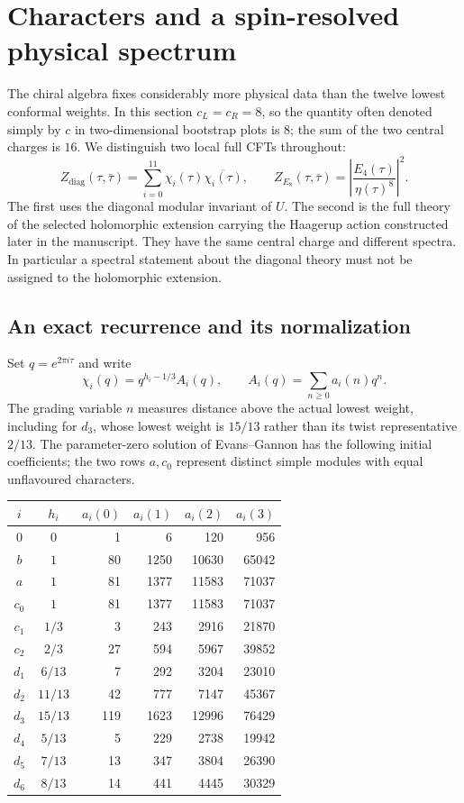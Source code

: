 \section{Characters and a spin-resolved physical spectrum}
\label{sec:physics-spectrum}

The chiral algebra fixes considerably more physical data than the twelve
lowest conformal weights.  In this section $c_L=c_R=8$, so the quantity
often denoted simply by $c$ in two-dimensional bootstrap plots is $8$;
the sum of the two central charges is $16$.  We distinguish two local
full CFTs throughout:
\begin{equation}\label{eq:physics-two-partitions}
 Z_{\mathrm{diag}}(\tau,\bar\tau)
   =\sum_{i=0}^{11}\chi_i(\tau)\overline{\chi_i(\tau)},
 \qquad
 Z_{E_8}(\tau,\bar\tau)
   =\left|\frac{E_4(\tau)}{\eta(\tau)^8}\right|^2.
\end{equation}
The first uses the diagonal modular invariant of $U$.  The second is
the full theory of the selected holomorphic extension carrying the
Haagerup action constructed later in the manuscript.  They have the
same central charge and different spectra.  In particular a spectral
statement about the diagonal theory must not be assigned to the
holomorphic extension.

\subsection{An exact recurrence and its normalization}

Set $q=e^{2\pi i\tau}$ and write
\[
 \chi_i(q)=q^{h_i-1/3}A_i(q),\qquad
 A_i(q)=\sum_{n\geq0}a_i(n)q^n.
\]
The grading variable $n$ measures distance above the actual lowest
weight, including for $d_3$, whose lowest weight is $15/13$ rather
than its twist representative $2/13$.  The parameter-zero solution of
Evans--Gannon \cite[Sections~1.4 and~2.4]{EG} has the following initial
coefficients; the two rows $a,c_0$ represent distinct simple modules
with equal unflavoured characters.
\begin{center}
\begin{tabular}{c|c|rrrr}
 $i$&$h_i$&$a_i(0)$&$a_i(1)$&$a_i(2)$&$a_i(3)$\\\hline
 $0$&$0$&1&6&120&956\\
 $b$&$1$&80&1250&10630&65042\\
 $a$&$1$&81&1377&11583&71037\\
 $c_0$&$1$&81&1377&11583&71037\\
 $c_1$&$1/3$&3&243&2916&21870\\
 $c_2$&$2/3$&27&594&5967&39852\\
 $d_1$&$6/13$&7&292&3204&23010\\
 $d_2$&$11/13$&42&777&7147&45367\\
 $d_3$&$15/13$&119&1623&12996&76429\\
 $d_4$&$5/13$&5&229&2738&19942\\
 $d_5$&$7/13$&13&347&3804&26390\\
 $d_6$&$8/13$&14&441&4445&30329
\end{tabular}
\end{center}

